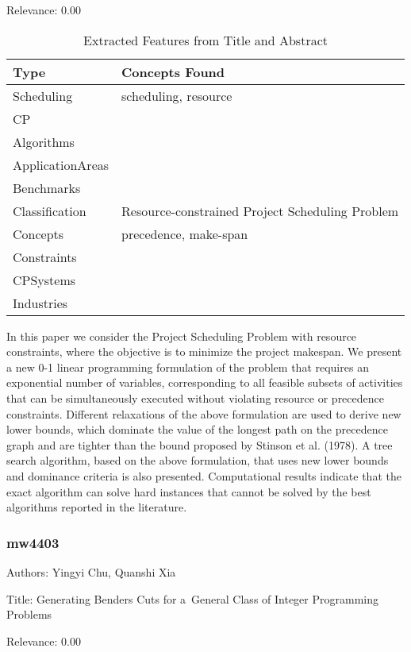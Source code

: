 Relevance:  0.00

{\scriptsize
\begin{longtable}{p{2cm}p{20cm}}
\caption{Extracted Features from Title and Abstract}\\ \toprule
Type & Concepts Found\\ \midrule
\endhead
\bottomrule
\endfoot
Scheduling & scheduling, resource\\ 
CP & \\ 
Algorithms & \\ 
ApplicationAreas & \\ 
Benchmarks & \\ 
Classification & Resource-constrained Project Scheduling Problem\\ 
Concepts & precedence, make-span\\ 
Constraints & \\ 
CPSystems & \\ 
Industries & \\ 
\end{longtable}
}

  In this paper we consider the Project Scheduling Problem with resource constraints, where the objective is to minimize the project makespan. We present a new 0-1 linear programming formulation of the problem that requires an exponential number of variables, corresponding to all feasible subsets of activities that can be simultaneously executed without violating resource or precedence constraints. Different relaxations of the above formulation are used to derive new lower bounds, which dominate the value of the longest path on the precedence graph and are tighter than the bound proposed by Stinson et al. (1978).    A tree search algorithm, based on the above formulation, that uses new lower bounds and dominance criteria is also presented. Computational results indicate that the exact algorithm can solve hard instances that cannot be solved by the best algorithms reported in the literature.  

\subsubsection{mw4403}
\label{mw:mw4403}

Authors: Yingyi Chu, Quanshi Xia

Title: Generating Benders Cuts for a General Class of Integer Programming Problems

Relevance:  0.00

